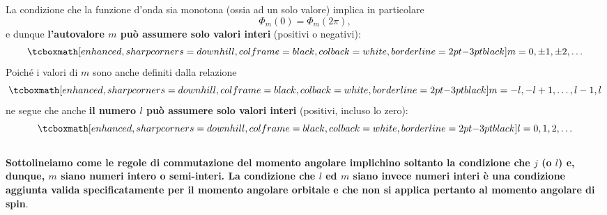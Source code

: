 \documentclass[a4paper,12pt,oneside]{book}
\begin{document}
La condizione che la funzione d'onda sia monotona (ossia ad un solo valore) implica in particolare
	\begin{equation}
		\Phi _m (0) =\Phi _m (2\pi ) ,
	\label{eq:cap17_10}
	\end{equation}
e dunque \textbf{l'autovalore $m$ può assumere solo valori interi} (positivi o negativi):
	\begin{equation}
		\tcboxmath[enhanced, sharp corners=downhill, colframe=black, colback=white, borderline={2pt}{-3pt}{black}]{
			m= 0, \pm 1,\pm 2, \dots
			}
	\end{equation}
Poiché i valori di $m$ sono anche definiti dalla relazione
	\begin{equation}
		\tcboxmath[enhanced, sharp corners=downhill, colframe=black, colback=white, borderline={2pt}{-3pt}{black}]{
			m = -l, -l+1,\dots, l-1,l
			}
	\end{equation}
ne segue che anche \textbf{il numero $l$ può assumere solo valori interi} (positivi, incluso lo zero):
	\begin{equation}
		\tcboxmath[enhanced, sharp corners=downhill, colframe=black, colback=white, borderline={2pt}{-3pt}{black}]{
			l= 0,1,2,\dots
			}
	\end{equation}\\
	
\textbf{Sottolineiamo come le regole di commutazione del momento angolare implichino soltanto la condizione che $j$ (o $l$) e, dunque, $m$  siano numeri intero o semi-interi. La condizione che $l$ ed $m$ siano invece numeri interi è una condizione aggiunta valida specificatamente per il momento angolare orbitale e che non si applica pertanto al momento angolare di spin}.\\
\end{document}
